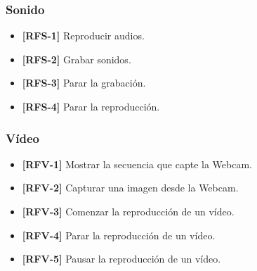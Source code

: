 \subsubsection{Sonido}
\begin{itemize}
\item{\textbf{[RFS-1]} Reproducir audios.}
\item{\textbf{[RFS-2]} Grabar sonidos.}
\item{\textbf{[RFS-3]} Parar la grabación.}
\item{\textbf{[RFS-4]} Parar la reproducción.}
\end{itemize}
\subsubsection{Vídeo}
\begin{itemize}
\item{\textbf{[RFV-1]} Mostrar la secuencia que capte la Webcam.}
\item{\textbf{[RFV-2]} Capturar una imagen desde la Webcam.}
\item{\textbf{[RFV-3]} Comenzar la reproducción de un vídeo.}
\item{\textbf{[RFV-4]} Parar la reproducción de un vídeo.}
\item{\textbf{[RFV-5]} Pausar la reproducción de un vídeo.}
\end{itemize}
